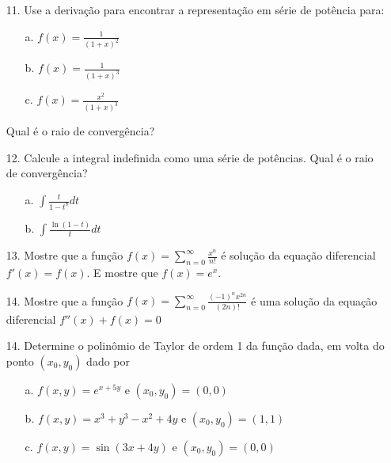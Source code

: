 \begin{itemize}
	\item[11.] Use a derivação para encontrar a representação em série de potência para:
	\begin{itemize}
		\item[a.] $f(x)=\frac{1}{(1+x)^{2}}$
		\item[b.] $f(x)=\frac{1}{(1+x)^{3}}$
		\item[c.] $f(x)=\frac{x^{2}}{(1+x)^{3}}$
	\end{itemize}
Qual é o raio de convergência?
\end{itemize}
\begin{itemize}
	\item [12.] Calcule a integral indefinida como uma série de potências. Qual é o raio de convergência?
	\begin{itemize}
		\item[a.] $\int\frac{t}{1-t^{8}}dt$
		\item[b.] $\int\frac{\ln (1-t)}{t}dt$
	\end{itemize} 
\end{itemize}
\begin{itemize}
	\item [13.] Mostre que a função $f(x)=\sum_{n=0}^{\infty}\frac{x^{n}}{n!}$ é solução da equação diferencial $f'(x)=f(x)$. E mostre que $f(x)=e^{x}$.
\end{itemize}
\begin{itemize}
	\item [14.] Mostre que a função $f(x)=\sum_{n=0}^{\infty} \frac{(-1)^{n}x^{2n}}{(2n)!}$ é uma solução da equação diferencial $f''(x)+f(x)=0$
\end{itemize}
\begin{itemize}
	\item [14.] Determine o polinômio de Taylor de ordem 1 da função dada, em volta do ponto $(x_{0},y_{0})$ dado por 
	\begin{itemize}
		\item[a.] $f(x,y)=e^{x+5y}$ e $(x_{0},y_{0})=(0,0)$
		\item[b.] $f(x,y)=x^{3}+y^{3}-x^{2}+4y$ e $(x_{0},y_{0})=(1,1)$
		\item[c.] $f(x,y)=\sin (3x+4y)$ e $(x_{0},y_{0})=(0,0)$
	\end{itemize}    
\end{itemize}

